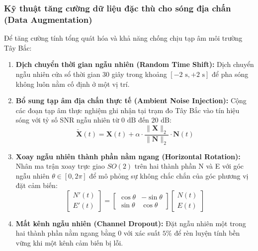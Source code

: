 \documentclass[preprint,1p]{elsarticle}
\begin{document}
\subsubsection{Kỹ thuật tăng cường dữ liệu đặc thù cho sóng địa chấn (Data Augmentation)}
Để tăng cường tính tổng quát hóa và khả năng chống chịu tạp âm môi trường Tây Bắc:
\begin{enumerate}
    \item \textbf{Dịch chuyển thời gian ngẫu nhiên (Random Time Shift):} Dịch chuyển ngẫu nhiên cửa sổ thời gian 30 giây trong khoảng $[-2\text{ s}, +2\text{ s}]$ để pha sóng không luôn nằm cố định ở một vị trí.
    \item \textbf{Bổ sung tạp âm địa chấn thực tế (Ambient Noise Injection):} Cộng các đoạn tạp âm thực nghiệm ghi nhận tại trạm đo Tây Bắc vào tín hiệu sóng với tỷ số SNR ngẫu nhiên từ $0\text{ dB}$ đến $20\text{ dB}$:
    \begin{equation}
    \tilde{\mathbf{X}}(t) = \mathbf{X}(t) + \alpha \cdot \frac{\|\mathbf{X}\|_2}{\|\mathbf{N}\|_2} \cdot \mathbf{N}(t)
    \label{eq:noise_inject}
    \end{equation}
    \item \textbf{Xoay ngẫu nhiên thành phần nằm ngang (Horizontal Rotation):} Nhân ma trận xoay trực giao $SO(2)$ trên hai thành phần N và E với góc ngẫu nhiên $\theta \in [0, 2\pi]$ để mô phỏng sự không chắc chắn của góc phương vị đặt cảm biến:
    \begin{equation}
    \begin{bmatrix} N'(t) \\ E'(t) \end{bmatrix} = \begin{bmatrix} \cos\theta & -\sin\theta \\ \sin\theta & \cos\theta \end{bmatrix} \begin{bmatrix} N(t) \\ E(t) \end{bmatrix}
    \label{eq:rotation}
    \end{equation}
    \item \textbf{Mất kênh ngẫu nhiên (Channel Dropout):} Đặt ngẫu nhiên một trong hai thành phần nằm ngang bằng 0 với xác suất $5\%$ để rèn luyện tính bền vững khi một kênh cảm biến bị lỗi.
\end{enumerate}
\end{document}
